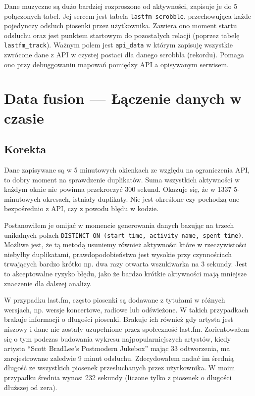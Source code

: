 \documentclass[brudnopis]{xmgr}
\begin{document}
    Dane muzyczne są dużo bardziej rozproszone od aktywności, zapisuje je do 5 połączonych tabel.
    Jej sercem jest tabela \verb|lastfm_scrobble|, przechowująca każde pojedynczy odsłuch piosenki przez użytkownika.
    Zawiera ono moment startu odsłuchu oraz jest punktem startowym do pozostałych relacji (poprzez tabelę \verb|lastfm_track|).
    Ważnym polem jest \verb|api_data| w którym zapisuję wszystkie zwrócone dane z API w czystej postaci dla danego scrobbla (rekordu).
    Pomaga ono przy debuggowaniu mapowań pomiędzy API a opisywanym serwisem.

    \section{Data fusion --- Łączenie danych w czasie}

        \subsection{Korekta}

            Dane zapisywane są w 5 minutowych okienkach ze względu na ograniczenia API, to dobry moment na sprawdzenie duplikatów.
            Suma wszystkich aktywności w każdym oknie nie powinna przekroczyć 300 sekund.
            Okazuje się, że w 1337 5-minutowych okresach, istniały duplikaty.
            Nie jest określone czy pochodzą one bezpośrednio z API, czy z powodu błędu w kodzie.

            Postanowiłem je omijać w momencie generowania danych bazując na trzech unikalnych polach \verb|DISTINCT ON (start_time, activity_name, spent_time)|.
            Możliwe jest, że tą metodą usuniemy również aktywności które w rzeczywistości niebyłby duplikatami,
            prawdopodobieństwo jest wysokie przy czynnościach trwających bardzo krótko np. dwa razy otwarta wszukiwarka na 3 sekundy.
            Jest to akceptowalne ryzyko błędu, jako że bardzo krótkie aktywności mają mniejsze znaczenie dla dalszej analizy.

            W przypadku last.fm, często piosenki są dodawane z tytułami w różnych wersjach, np. wersje koncertowe, radiowe lub odświeżone.
            W takich przypadkach brakuje informacji o długości piosenki.
            Brakuje ich również gdy artysta jest niszowy i dane nie zostały uzupełnione przez społeczność last.fm.
            Zorientowałem się o tym podczas budowania wykresu najpopularniejszych artystów,
            kiedy artysta ``Scott BradLee's Postmodern Jukebox'' mając 33 odtworzenia, ma zarejestrowane zaledwie 9 minut odsłuchu.
            Zdecydowałem nadać im średnią długość ze wszystkich piosenek przesłuchanych przez użytkownika.
            W moim przypadku średnia wynosi 232 sekundy (liczone tylko z piosenek o długości dłuższej od zera).
\end{document}
